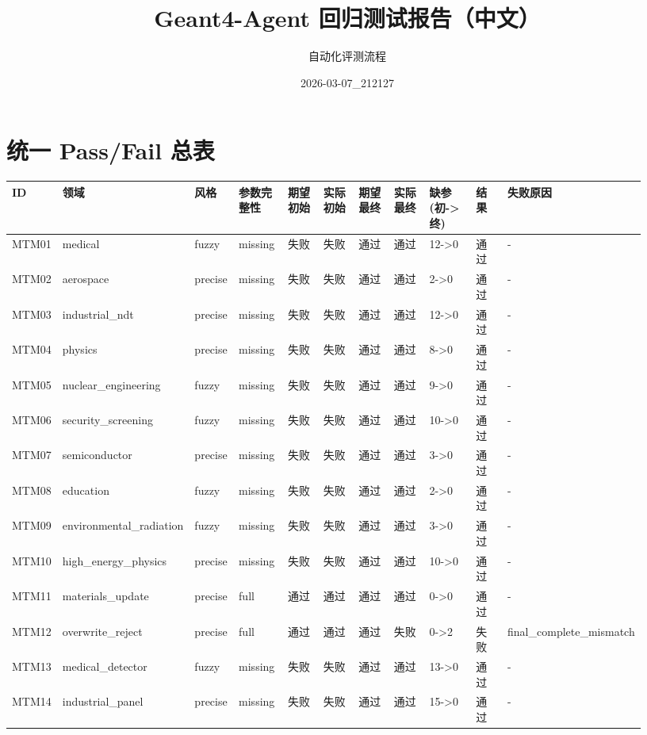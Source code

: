 \documentclass[11pt]{ctexart}
\title{Geant4-Agent 回归测试报告（中文）}
\author{自动化评测流程}
\date{2026-03-07\_212127}
\begin{document}
\maketitle
\section{统一 Pass/Fail 总表}
\begin{longtable}{p{0.06\linewidth}p{0.08\linewidth}p{0.07\linewidth}p{0.08\linewidth}p{0.07\linewidth}p{0.07\linewidth}p{0.07\linewidth}p{0.07\linewidth}p{0.09\linewidth}p{0.06\linewidth}p{0.21\linewidth}}
\toprule
ID & 领域 & 风格 & 参数完整性 & 期望初始 & 实际初始 & 期望最终 & 实际最终 & 缺参(初->终) & 结果 & 失败原因 \\
\midrule
MTM01 & medical & fuzzy & missing & 失败 & 失败 & 通过 & 通过 & 12->0 & 通过 & - \\
MTM02 & aerospace & precise & missing & 失败 & 失败 & 通过 & 通过 & 2->0 & 通过 & - \\
MTM03 & industrial\_ndt & precise & missing & 失败 & 失败 & 通过 & 通过 & 12->0 & 通过 & - \\
MTM04 & physics & precise & missing & 失败 & 失败 & 通过 & 通过 & 8->0 & 通过 & - \\
MTM05 & nuclear\_engineering & fuzzy & missing & 失败 & 失败 & 通过 & 通过 & 9->0 & 通过 & - \\
MTM06 & security\_screening & fuzzy & missing & 失败 & 失败 & 通过 & 通过 & 10->0 & 通过 & - \\
MTM07 & semiconductor & precise & missing & 失败 & 失败 & 通过 & 通过 & 3->0 & 通过 & - \\
MTM08 & education & fuzzy & missing & 失败 & 失败 & 通过 & 通过 & 2->0 & 通过 & - \\
MTM09 & environmental\_radiation & fuzzy & missing & 失败 & 失败 & 通过 & 通过 & 3->0 & 通过 & - \\
MTM10 & high\_energy\_physics & precise & missing & 失败 & 失败 & 通过 & 通过 & 10->0 & 通过 & - \\
MTM11 & materials\_update & precise & full & 通过 & 通过 & 通过 & 通过 & 0->0 & 通过 & - \\
MTM12 & overwrite\_reject & precise & full & 通过 & 通过 & 通过 & 失败 & 0->2 & 失败 & final\_complete\_mismatch \\
MTM13 & medical\_detector & fuzzy & missing & 失败 & 失败 & 通过 & 通过 & 13->0 & 通过 & - \\
MTM14 & industrial\_panel & precise & missing & 失败 & 失败 & 通过 & 通过 & 15->0 & 通过 & - \\

\end{longtable}
\end{document}

